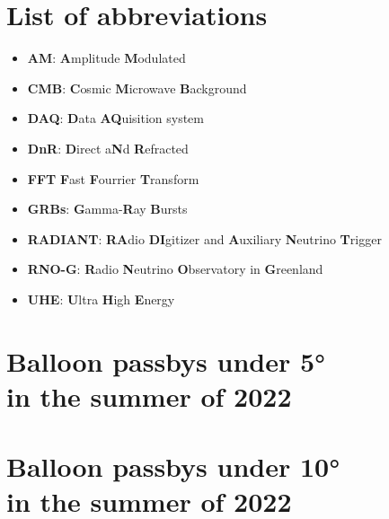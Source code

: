 \documentclass[11pt,a4paper,faculty=we,language=en,doctype=report]{cls/ugent-doc}
\begin{document}
\chapter{List of abbreviations}
\begin{itemize}
\item \textbf{AM}: \textbf{A}mplitude \textbf{M}odulated
\item \textbf{CMB}: \textbf{C}osmic \textbf{M}icrowave \textbf{B}ackground
\item \textbf{DAQ}: \textbf{D}ata \textbf{AQ}uisition system
\item \textbf{DnR}: \textbf{D}irect a\textbf{N}d \textbf{R}efracted
\item \textbf{FFT} \textbf{F}ast \textbf{F}ourrier \textbf{T}ransform
\item \textbf{GRBs}: \textbf{G}amma-\textbf{R}ay \textbf{B}ursts
\item \textbf{RADIANT}: \textbf{RA}dio \textbf{DI}gitizer and \textbf{A}uxiliary \textbf{N}eutrino \textbf{T}rigger
\item \textbf{RNO-G}: \textbf{R}adio \textbf{N}eutrino \textbf{O}bservatory in \textbf{G}reenland
\item \textbf{UHE}: \textbf{U}ltra \textbf{H}igh \textbf{E}nergy 
\end{itemize}
\chapter{Balloon passbys under 5°\\ in the summer of 2022}
\label{app:5Deg}
\chapter{Balloon passbys under 10°\\ in the summer of 2022}
\label{app:10Deg}
\begin{table}[h!]
\end{table}
\begin{table}
\end{table}
\begin{table}
\end{table}
\begin{table}
\end{table}
\begin{table}
\end{table}

\newpage


\end{document}
